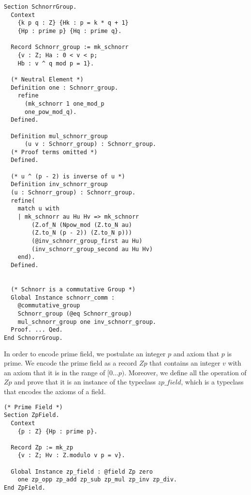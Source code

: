 \documentclass[conference,compsoc]{IEEEtran}
\begin{document}
 \begin{lstlisting}[frame=single, language=Coq, caption={Coq Encoding of the Schnorr Group},
  label={ind_nat},captionpos=t, basicstyle=\ttfamily\footnotesize,
  abovecaptionskip=-\medskipamount]
Section SchnorrGroup. 
  Context 
    {k p q : Z} {Hk : p = k * q + 1}
    {Hp : prime p} {Hq : prime q}.

  Record Schnorr_group := mk_schnorr 
    {v : Z; Ha : 0 < v < p; 
    Hb : v ^ q mod p = 1}.

  (* Neutral Element *)
  Definition one : Schnorr_group.
    refine 
      (mk_schnorr 1 one_mod_p 
      one_pow_mod_q).
  Defined. 

  Definition mul_schnorr_group 
      (u v : Schnorr_group) : Schnorr_group.
  (* Proof terms omitted *)
  Defined. 

  (* u ^ (p - 2) is inverse of u *)
  Definition inv_schnorr_group 
  (u : Schnorr_group) : Schnorr_group.
  refine(
    match u with 
    | mk_schnorr au Hu Hv => mk_schnorr
        (Z.of_N (Npow_mod (Z.to_N au) 
        (Z.to_N (p - 2)) (Z.to_N p)))
        (@inv_schnorr_group_first au Hu)
        (inv_schnorr_group_second au Hu Hv)
    end).
  Defined.


  (* Schnorr is a commutative Group *)
  Global Instance schnorr_comm : 
    @commutative_group 
    Schnorr_group (@eq Schnorr_group) 
    mul_schnorr_group one inv_schnorr_group.
  Proof. ... Qed. 
End SchnorrGroup.
\end{lstlisting}


In order to encode prime field, we postulate an integer $p$ and 
axiom that $p$ is prime. We encode the prime field as 
a record $Zp$ that contains an integer $v$ with an axiom 
that it is in the range of $[0 \ldots p)$. Moreover, 
we define all the operation of $Zp$ and prove that 
it is an instance of the typeclass $zp\_field$, which is 
a typeclass that encodes the axioms of a field. 

\begin{lstlisting}[frame=single, language=Coq, caption={Coq Encoding of Prime Field},
  label={ind_nat},captionpos=t, basicstyle=\ttfamily\footnotesize,
  abovecaptionskip=-\medskipamount]
(* Prime Field *)
Section ZpField.
  Context 
    {p : Z} {Hp : prime p}.

  Record Zp := mk_zp 
    {v : Z; Hv : Z.modulo v p = v}.

  Global Instance zp_field : @field Zp zero 
    one zp_opp zp_add zp_sub zp_mul zp_inv zp_div.
End ZpField. 
\end{lstlisting}
\end{document}
